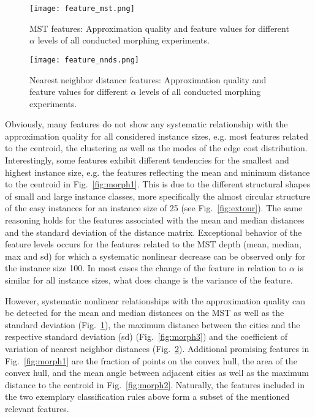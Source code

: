 \documentclass{article}
\begin{document}
\begin{figure}
  \centering
  \texttt{[image: feature\_mst.png]}
  \caption{MST features: Approximation quality and feature values for
    different $\alpha$ levels of all conducted morphing experiments.}
  \label{fig:morph4}
\end{figure}

\begin{figure}
  \centering
  \texttt{[image: feature\_nnds.png]}
  \caption{Nearest  neighbor distance features:  Approximation quality
    and feature values for  different $\alpha$ levels of all conducted
    morphing experiments.}
  \label{fig:morph5}
\end{figure}

Obviously, many features do not show any systematic relationship with
the approximation quality for all considered instance sizes, e.g. most
features related to the centroid, the clustering as well as the modes
of the edge cost distribution. Interestingly, some features exhibit
different tendencies for the smallest and highest instance size,
e.g. the features reflecting the mean and minimum distance to the
centroid in Fig.~\ref{fig:morph1}. This is due to the different
structural shapes of small and large instance classes, more
specifically the almost circular structure of the easy instances for
an instance size of 25 (see Fig.~\ref{fig:extour}). The same reasoning
holds for the features associated with the mean and median distances
and the standard deviation of the distance matrix. Exceptional
behavior of the feature levels occurs for the features related to the
MST depth (mean, median, max and sd) for which a systematic nonlinear
decrease can be observed only for the instance size 100.  In
most cases the change of the feature in relation to $\alpha$ is
similar for all instance sizes, what does change is the variance of
the feature.

However, systematic nonlinear relationships with the approximation
quality can be detected for the mean and median distances on the MST
as well as the standard deviation (Fig.~\ref{fig:morph4}), the maximum
distance between the cities and the respective standard deviation (sd)
(Fig.~\ref{fig:morph3}) and the coefficient of variation of nearest
neighbor distances (Fig.~\ref{fig:morph5}). Additional promising
features in Fig.~\ref{fig:morph1} are the fraction of points on the
convex hull, the area of the convex hull, and the mean angle between
adjacent cities as well as the maximum distance to the centroid in
Fig.~\ref{fig:morph2}. Naturally, the features included in the two
exemplary classification rules above form a subset of the mentioned
relevant features.
\end{document}
